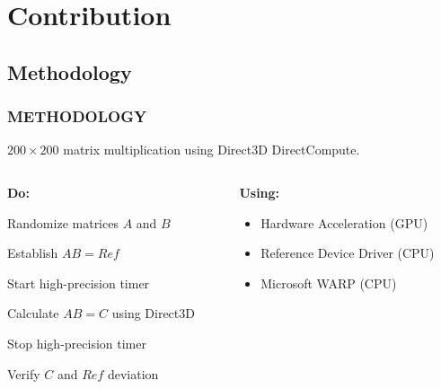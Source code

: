 \section{Contribution}

\subsection{Methodology}
\begin{frame}
\frametitle{METHODOLOGY}

{\small%
  $200\times 200$ matrix multiplication using Direct3D DirectCompute.
  \begin{columns}[T]
    \begin{column}[T]{0.5\textwidth}
      \textbf{Do:}
      \begin{enumerate*}
      \item Randomize matrices $A$ and $B$
      \item Establish $AB=Ref$
      \item Start high-precision timer
      \item Calculate $AB=C$ using Direct3D
      \item Stop high-precision timer
      \item Verify $C$ and $Ref$ deviation
      \end{enumerate*}
    \end{column}
    \begin{column}[T]{0.5\textwidth}
      \textbf{Using:}
      \begin{itemize}
      \item Hardware Acceleration (GPU)
      \item Reference Device Driver (CPU)
      \item Microsoft WARP (CPU)
      \end{itemize}
    \end{column}
\end{columns}}


\end{frame}
